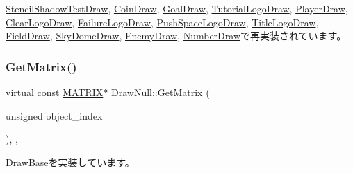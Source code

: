 \mbox{\hyperlink{class_stencil_shadow_test_draw_abfc9caaaa1b6120e2013701a9d264f2d}{Stencil\+Shadow\+Test\+Draw}}, \mbox{\hyperlink{class_coin_draw_a869a6b7273b273048dd56822fae4d644}{Coin\+Draw}}, \mbox{\hyperlink{class_goal_draw_a47baf72f8c1c961176610f161069b8d1}{Goal\+Draw}}, \mbox{\hyperlink{class_tutorial_logo_draw_a3a97860361e32a727246e99052715f37}{Tutorial\+Logo\+Draw}}, \mbox{\hyperlink{class_player_draw_ae818d3adaf5120845c2a78c230b5365e}{Player\+Draw}}, \mbox{\hyperlink{class_clear_logo_draw_ab356bf5d56c10a6689e101b35c30d889}{Clear\+Logo\+Draw}}, \mbox{\hyperlink{class_failure_logo_draw_aaac019fb396a354ef0f823ed2bd72322}{Failure\+Logo\+Draw}}, \mbox{\hyperlink{class_push_space_logo_draw_a0734eed4096afb12e6c9ef1f4d82b9d8}{Push\+Space\+Logo\+Draw}}, \mbox{\hyperlink{class_title_logo_draw_a8858aa1b1eb9a6d4cb4605519efb20eb}{Title\+Logo\+Draw}}, \mbox{\hyperlink{class_field_draw_ab126f938895211ff170bc37045a8e7a2}{Field\+Draw}}, \mbox{\hyperlink{class_sky_dome_draw_acbc487d912b464474ae6f1afd7d6bb74}{Sky\+Dome\+Draw}}, \mbox{\hyperlink{class_enemy_draw_a12f00116f7fa97e07317a949d5c27bb4}{Enemy\+Draw}}, \mbox{\hyperlink{class_number_draw_a3348d9d1cdd9dd03be25b82069275ca5}{Number\+Draw}}で再実装されています。

\mbox{\label{class_draw_null_adede079e9c11a756090740b20bb43022}} 
\subsubsection{\texorpdfstring{Get\+Matrix()}{GetMatrix()}}
{\footnotesize\ttfamily virtual const \mbox{\hyperlink{_vector3_d_8h_a032295cd9fb1b711757c90667278e744}{M\+A\+T\+R\+IX}}$\ast$ Draw\+Null\+::\+Get\+Matrix (\begin{DoxyParamCaption}\item[{unsigned}]{object\+\_\+index }\end{DoxyParamCaption})\hspace{0.3cm}{\ttfamily [inline]}, {\ttfamily [override]}, {\ttfamily [virtual]}}



\mbox{\hyperlink{class_draw_base_a01239bf362040f7f2ef5e5f5371dcf18}{Draw\+Base}}を実装しています。



